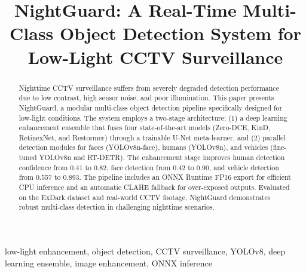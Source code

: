 \documentclass[conference]{IEEEtran}
\begin{document}
\title{NightGuard: A Real-Time Multi-Class Object Detection System for Low-Light CCTV Surveillance}

\author{
\and
{}
\and
{}
\and
{}
}

\maketitle

\begin{abstract}
Nighttime CCTV surveillance suffers from severely degraded detection performance due to low contrast, high sensor noise, and poor illumination. This paper presents NightGuard, a modular multi-class object detection pipeline specifically designed for low-light conditions. The system employs a two-stage architecture: (1) a deep learning enhancement ensemble that fuses four state-of-the-art models (Zero-DCE, KinD, RetinexNet, and Restormer) through a trainable U-Net meta-learner, and (2) parallel detection modules for faces (YOLOv8n-face), humans (YOLOv8n), and vehicles (fine-tuned YOLOv8n and RT-DETR). The enhancement stage improves human detection confidence from 0.41 to 0.82, face detection from 0.42 to 0.90, and vehicle detection from 0.557 to 0.893. The pipeline includes an ONNX Runtime FP16 export for efficient CPU inference and an automatic CLAHE fallback for over-exposed outputs. Evaluated on the ExDark dataset and real-world CCTV footage, NightGuard demonstrates robust multi-class detection in challenging nighttime scenarios.
\end{abstract}

\begin{IEEEkeywords}
low-light enhancement, object detection, CCTV surveillance, YOLOv8, deep learning ensemble, image enhancement, ONNX inference
\end{IEEEkeywords}
\end{document}
